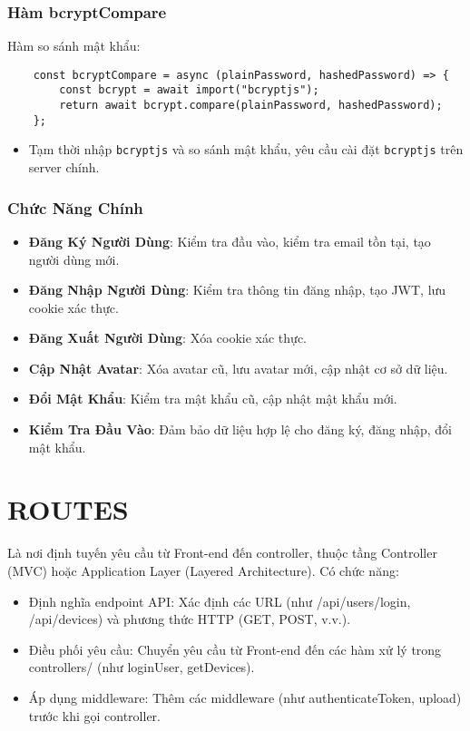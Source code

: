             \subsubsection{Hàm bcryptCompare}
                \hspace*{0.6cm}Hàm so sánh mật khẩu:
                \begin{lstlisting}
    const bcryptCompare = async (plainPassword, hashedPassword) => {
        const bcrypt = await import("bcryptjs");
        return await bcrypt.compare(plainPassword, hashedPassword);
    };
                \end{lstlisting}
                \begin{itemize}
                    \item Tạm thời nhập \texttt{bcryptjs} và so sánh mật khẩu, yêu cầu cài đặt \texttt{bcryptjs} trên server chính.
                \end{itemize}

            \subsubsection{Chức Năng Chính}
                \begin{itemize}
                    \item \textbf{Đăng Ký Người Dùng}: Kiểm tra đầu vào, kiểm tra email tồn tại, tạo người dùng mới.
                    \item \textbf{Đăng Nhập Người Dùng}: Kiểm tra thông tin đăng nhập, tạo JWT, lưu cookie xác thực.
                    \item \textbf{Đăng Xuất Người Dùng}: Xóa cookie xác thực.
                    \item \textbf{Cập Nhật Avatar}: Xóa avatar cũ, lưu avatar mới, cập nhật cơ sở dữ liệu.
                    \item \textbf{Đổi Mật Khẩu}: Kiểm tra mật khẩu cũ, cập nhật mật khẩu mới.
                    \item \textbf{Kiểm Tra Đầu Vào}: Đảm bảo dữ liệu hợp lệ cho đăng ký, đăng nhập, đổi mật khẩu.
                \end{itemize}
    \section{ROUTES}
        \hspace*{0.6cm}Là nơi định tuyến yêu cầu từ Front-end đến controller, thuộc tầng Controller (MVC) hoặc Application Layer (Layered Architecture). Có chức năng:
        \begin{itemize}
            \item Định nghĩa endpoint API: Xác định các URL (như /api/users/login, /api/devices) và phương thức HTTP (GET, POST, v.v.).
            \item Điều phối yêu cầu: Chuyển yêu cầu từ Front-end đến các hàm xử lý trong controllers/ (như loginUser, getDevices).
            \item Áp dụng middleware: Thêm các middleware (như authenticateToken, upload) trước khi gọi controller.
        \end{itemize}
